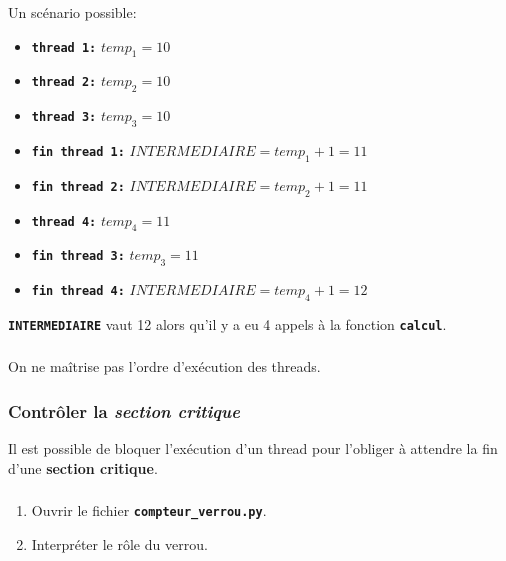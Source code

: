 \documentclass[svgnames,11pt]{beamer}
\begin{document}
\begin{frame}
    \frametitle{}

    Un scénario possible:
    \begin{itemize}
        \item \textbf{\texttt{thread 1:}} \textbf{\texttt{$temp_1=10$}}
        \item \textbf{\texttt{thread 2:}} \textbf{\texttt{$temp_2=10$}}
        \item \textbf{\texttt{thread 3:}} \textbf{\texttt{$temp_3=10$}}
        \item \textbf{\texttt{fin thread 1:}} \textbf{\texttt{$INTERMEDIAIRE=temp_1+1=11$}}
        \item \textbf{\texttt{fin thread 2:}} \textbf{\texttt{$INTERMEDIAIRE=temp_2+1=11$}}
        \item \textbf{\texttt{thread 4:}} \textbf{\texttt{$temp_4=11$}}
        \item \textbf{\texttt{fin thread 3:}} \textbf{\texttt{$temp_3=11$}}
        \item \textbf{\texttt{fin thread 4:}} \textbf{\texttt{$INTERMEDIAIRE=temp_4+1=12$}}
    \end{itemize}
    \begin{center}
        \textbf{\texttt{INTERMEDIAIRE}} vaut 12 alors qu'il y a eu 4 appels à la fonction \textbf{\texttt{calcul}}.
    \end{center}
\end{frame}
\begin{frame}
    \frametitle{}

    \begin{aretenir}[Observation]
        On ne maîtrise pas l'ordre d'exécution des threads.
    \end{aretenir}

\end{frame}
\begin{frame}
    \frametitle{Contrôler la \emph{section critique}}

    \begin{center}
        Il est possible de bloquer l'exécution d'un thread pour l'obliger à attendre la fin d'une \textbf{section critique}.
    \end{center}

\end{frame}
\begin{frame}
    \frametitle{}

    \begin{activite}
        \begin{enumerate}
            \item Ouvrir le fichier \textbf{\texttt{compteur\_verrou.py}}.
            \item Interpréter le rôle du verrou.
        \end{enumerate}
    \end{activite}

\end{frame}
\end{document}
